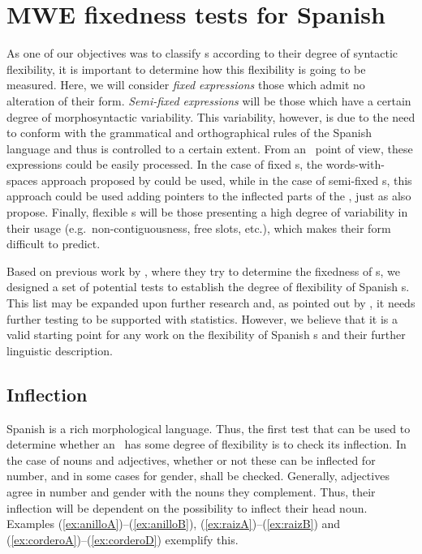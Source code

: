 \documentclass[output=paper]{langsci/langscibook}
\begin{document}
\section{MWE fixedness tests for Spanish}
\label{sec:fixednessTests}

As one of our objectives was to classify \mwe s according to their degree of syntactic flexibility, it is important to determine how this flexibility is going to be measured.
Here, we will consider \textit{fixed expressions} those which admit no alteration of their form.
\textit{Semi-fixed expressions} will be those which have a certain degree of morphosyntactic variability. 
This variability, however, is due to the need to conform with the grammatical and orthographical rules of the Spanish language and thus is controlled to a certain extent.
From an \nlp\ point of view, these expressions could be easily processed.
In the case of fixed \mwe s, the words-with-spaces approach proposed by \citet{Sag:2002} could be used, while in the case of semi-fixed \mwe s, this approach could be used adding pointers to the inflected parts of the \mwe, just as \citet{Sag:2002} also propose.
Finally, flexible \mwe s will be those presenting a high degree of variability in their usage (e.g.\ non-contiguousness, free slots, etc.), which makes their form difficult to predict.

Based on previous work by \citet{Nunberg1994}, where they try to determine the fixedness of \mwe s, we designed a set of potential tests to establish the degree of flexibility of Spanish \mwe s.
This list may be expanded upon further research and, as pointed out by 
,
it needs further testing to be supported with statistics.
However, we believe that it is a valid starting point for any work on the flexibility of Spanish \mwe s and their further linguistic description.

\subsection{Inflection}
\label{ssec:inflection}

Spanish is a rich morphological language.
Thus, the first test that can be used to determine whether an \mwe\ has some degree of flexibility is to check its inflection.
In the case of nouns and adjectives, whether or not these can be inflected for number, and in some cases for gender, shall be checked.
Generally, adjectives agree in number and gender with the nouns they complement.
Thus, their inflection will be dependent on the possibility to inflect their head noun.
Examples (\ref{ex:anilloA})--(\ref{ex:anilloB}), (\ref{ex:raizA})--(\ref{ex:raizB}) and (\ref{ex:corderoA})--(\ref{ex:corderoD}) %
exemplify this.
\end{document}
